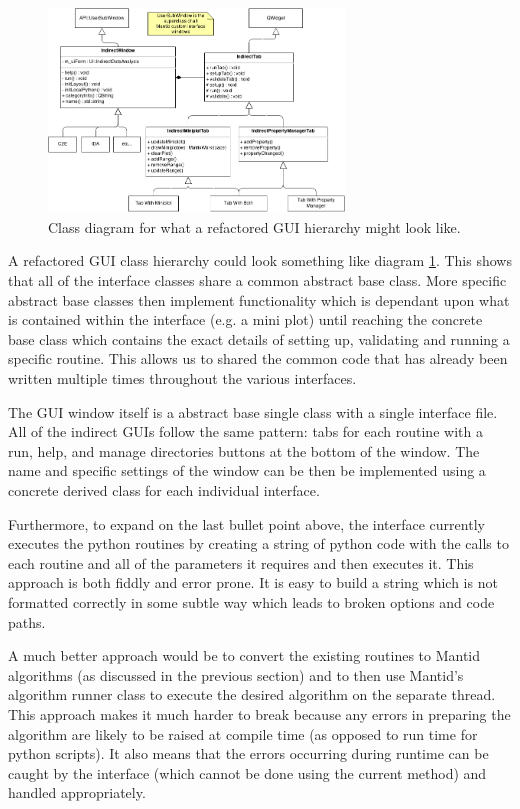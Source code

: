 \documentclass[paper=a4, fontsize=11pt]{scrartcl}	%
\numberwithin{equation}{section}															%
\numberwithin{figure}{section}																%
\numberwithin{table}{section}																%
\begin{document}
\begin{figure}[H]
\centering
\includegraphics[width=0.7\textwidth]{img/uml/class_diagrams/IndirectGUI_structure_proposed.png}
\caption{Class diagram for what a refactored GUI hierarchy might look like.}
\label{fig:indirect-gui-proposed}
\end{figure}

A refactored GUI class hierarchy could look something like diagram \ref{fig:indirect-gui-proposed}. This shows that all of the interface classes share a common abstract base class. More specific abstract base classes then implement functionality which is dependant upon what is contained within the interface (e.g. a mini plot) until reaching the concrete base class which contains the exact details of setting up, validating and running a specific routine. This allows us to shared the common code that has already been written multiple times throughout the various interfaces. 

The GUI window itself is a abstract base single class with a single interface file. All of the indirect GUIs follow the same pattern: tabs for each routine with a run, help, and manage directories buttons at the bottom of the window. The name and specific settings of the window can be then be implemented using a concrete derived class for each individual interface.

Furthermore, to expand on the last bullet point above, the interface currently executes the python routines by creating a string of python code with the calls to each routine and all of the parameters it requires and then executes it. This approach is both fiddly and error prone. It is easy to build a string which is not formatted correctly in some subtle way which leads to broken options and code paths.

A much better approach would be to convert the existing routines to Mantid algorithms (as discussed in the previous section) and to then use Mantid's algorithm runner class to execute the desired algorithm on the separate thread. This approach makes it much harder to break because any errors in preparing the algorithm are likely to be raised at compile time (as opposed to run time for python scripts). It also means that the errors occurring during runtime can be caught by the interface (which cannot be done using the current method) and handled appropriately. 
\end{document}
